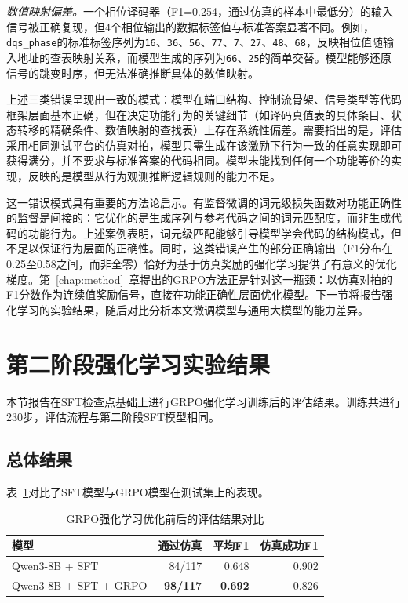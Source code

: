 \textit{数值映射偏差。}一个相位译码器（F1=0.254，通过仿真的样本中最低分）的输入信号被正确复现，但4个相位输出的数据标签值与标准答案显著不同。例如，\texttt{dqs\_phase}的标准标签序列为\texttt{16}、\texttt{36}、\texttt{56}、\texttt{77}、\texttt{7}、\texttt{27}、\texttt{48}、\texttt{68}，反映相位值随输入地址的查表映射关系，而模型生成的序列为\texttt{66}、\texttt{25}的简单交替。模型能够还原信号的跳变时序，但无法准确推断具体的数值映射。

上述三类错误呈现出一致的模式：模型在端口结构、控制流骨架、信号类型等代码框架层面基本正确，但在决定功能行为的关键细节（如译码真值表的具体条目、状态转移的精确条件、数值映射的查找表）上存在系统性偏差。需要指出的是，评估采用相同测试平台的仿真对拍，模型只需生成在该激励下行为一致的任意实现即可获得满分，并不要求与标准答案的代码相同。模型未能找到任何一个功能等价的实现，反映的是模型从行为观测推断逻辑规则的能力不足。

这一错误模式具有重要的方法论启示。有监督微调的词元级损失函数对功能正确性的监督是间接的：它优化的是生成序列与参考代码之间的词元匹配度，而非生成代码的功能行为。上述案例表明，词元级匹配能够引导模型学会代码的结构模式，但不足以保证行为层面的正确性。同时，这类错误产生的部分正确输出（F1分布在0.25至0.58之间，而非全零）恰好为基于仿真奖励的强化学习提供了有意义的优化梯度。第~\ref{chap:method}~章提出的GRPO方法正是针对这一瓶颈：以仿真对拍的F1分数作为连续值奖励信号，直接在功能正确性层面优化模型。下一节将报告强化学习的实验结果，随后对比分析本文微调模型与通用大模型的能力差异。


\section{第二阶段强化学习实验结果}

本节报告在SFT检查点基础上进行GRPO强化学习训练后的评估结果。训练共进行230步，评估流程与第二阶段SFT模型相同。

\subsection{总体结果}

表~\ref{tab:stage2-rl}对比了SFT模型与GRPO模型在测试集上的表现。

\begin{table}[htbp]
  \centering
  \caption{GRPO强化学习优化前后的评估结果对比}
  \label{tab:stage2-rl}
  \begin{tabular}{lrrr}
    \toprule
    模型 & 通过仿真 & 平均F1 & 仿真成功F1 \\
    \midrule
    Qwen3-8B + SFT & 84/117 & 0.648 & 0.902 \\
    Qwen3-8B + SFT + GRPO & \textbf{98/117} & \textbf{0.692} & 0.826 \\
    \bottomrule
  \end{tabular}
\end{table}

